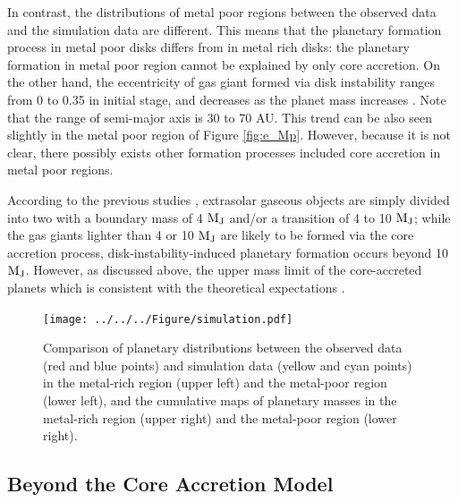 \documentclass[twocolumn, dvipdfmx]{aastex62}
\begin{document}
\begin{CJK*}{UTF8}{min}
In contrast, the distributions of metal poor regions between the observed data and the simulation data are different. This means that the planetary formation process in metal poor disks differs from in metal rich disks: the planetary formation in metal poor region cannot be explained by only core accretion. On the other hand, the eccentricity of gas giant formed via disk instability ranges from 0 to 0.35 in initial stage, and decreases as the planet mass increases \citep{2011ApJ...731...74B}. Note that the range of semi-major axis is 30 to 70 AU. This trend can be also seen slightly in the metal poor region of Figure \ref{fig:e_Mp}. However, because it is not clear, there possibly exists other formation processes included core accretion in metal poor regions.

According to the previous studies \citep[e.g.,][]{2007A&A...464..779R, 2017A&A...603A..30S, 2018ApJ...853...37S}, extrasolar gaseous objects are simply divided into two with a boundary mass of 4 $\rm M_J$ and/or a transition of 4 to 10 $\rm M_J$; while the gas giants lighter than 4 or 10 $\rm M_J$ are likely to be formed via the core accretion process, disk-instability-induced planetary formation occurs beyond 10 $\rm M_J$. However, as discussed above, the upper mass limit of the core-accreted planets which is consistent with the theoretical expectations \citep[e.g.,][]{2007ApJ...667..557T, 2012A&A...541A..97M, 2016ApJ...823...48T}.

\begin{figure}[t]
\begin{center}
\texttt{[image: ../../../Figure/simulation.pdf]}
\caption{Comparison of planetary distributions between the observed data (red and blue points) and simulation data (yellow and cyan points) in the metal-rich region (upper left) and the metal-poor region (lower left), and the cumulative maps of planetary masses in the metal-rich region (upper right) and the metal-poor region (lower right). \label{fig:simulation}}
\end{center}
\end{figure}


\subsection{Beyond the Core Accretion Model} \label{subsec:beyond}


\end{CJK*}
\end{document}

